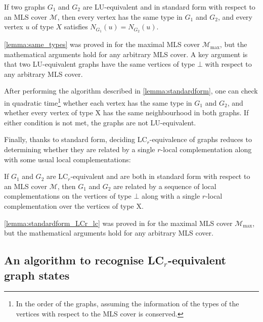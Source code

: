 \documentclass[a4paper,UKenglish,cleveref,autoref,thm-restate]{arxiv}
\begin{document}
\begin{lemma} \label{lemma:same_types}
    If two graphs $G_1$ and $G_2$ are LU-equivalent and in standard form with respect to an MLS cover $\mathcal M$, then every vertex has the same type in $G_1$ and $G_2$, and  every vertex $u$ of type $X$ satisfies $N_{G_1}(u) = N_{G_2}(u)$. 
\end{lemma}

\cref{lemma:same_types} was proved in \cite{claudet2024local} for the maximal MLS cover $\mathcal M_\text{max}$, but the mathematical arguments hold for any arbitrary MLS cover. A key argument is that two LU-equivalent graphs have the same vertices of type $\bot$ with respect to any arbitrary MLS cover. 


After performing the algorithm described in \cref{lemma:standardform}, one can check in quadratic time\footnote{In the order of the graphs, assuming the information of the types of the vertices with respect to the MLS cover is conserved.} whether each vertex has the same type  in $G_1$ and $G_2$, and whether every vertex of type X has the same neighbourhood in both graphs. If either condition is not met, the graphs are not LU-equivalent.


Finally, thanks to standard form, deciding LC$_r$-equivalence of graphs reduces to determining whether they are related by a single $r$-local complementation along with some usual local complementations:
\begin{lemma} \label{lemma:standardform_LCr_lc}
    If $G_1$ and $G_2$ are LC$_r$-equivalent and are both in standard form with respect to an MLS cover $\mathcal M$, then $G_1$ and $G_2$ are related by a sequence of local complementations on the vertices of type $\bot$ along with a single $r$-local complementation over the vertices of type X. \end{lemma}


\cref{lemma:standardform_LCr_lc} was proved in \cite{claudet2024local} for the maximal MLS cover $\mathcal M_\text{max}$, but the mathematical arguments hold for any arbitrary MLS cover. 


\subsection{An algorithm to recognise \texorpdfstring{LC$_r$}{LCr}-equivalent graph states} \label{subsec:algorithm_lcr}
\end{document}
